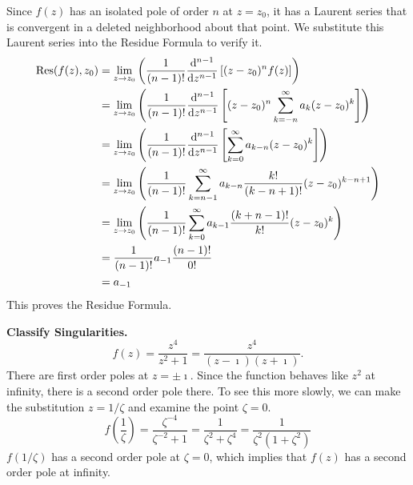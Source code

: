 {%
\begin{Solution}
  \label{solution residue formula}
  Since $f(z)$ has an isolated pole of order $n$ at $z = z_0$, it has
  a Laurent series that is convergent in a deleted neighborhood about 
  that point.  We substitute this Laurent series into the Residue
  Formula to verify it.
  \begin{align*}
    \mathop{\mathrm{Res}}\nolimits(f(z),z_0) 
    &= \lim_{z \to z_0} \left( \frac{1}{(n-1)!}
      \frac{\mathrm{d}^{n-1}}{\mathrm{d} z^{n-1}} \left[ (z-z_0)^n f(z) \right] 
    \right) \\
    &= \lim_{z \to z_0} \left( \frac{1}{(n-1)!}
      \frac{\mathrm{d}^{n-1}}{\mathrm{d} z^{n-1}} \left[ (z-z_0)^n 
        \sum_{k = -n}^\infty a_k (z - z_0)^k \right] \right) \\
    &= \lim_{z \to z_0} \left( \frac{1}{(n-1)!}
      \frac{\mathrm{d}^{n-1}}{\mathrm{d} z^{n-1}} \left[
        \sum_{k = 0}^\infty a_{k-n} (z - z_0)^k \right] \right) \\
    &= \lim_{z \to z_0} \left( \frac{1}{(n-1)!}
      \sum_{k = n-1}^\infty a_{k-n} \frac{ k! }{ (k-n+1)! } 
      (z - z_0)^{k-n+1} \right) \\
    &= \lim_{z \to z_0} \left( \frac{1}{(n-1)!}
      \sum_{k = 0}^\infty a_{k-1} \frac{ (k+n-1)! }{ k! } 
      (z - z_0)^k \right) \\
    &= \frac{1}{(n-1)!} a_{-1} \frac{(n-1)!}{0!} \\
    &= a_{-1}
  \end{align*}
  This proves the Residue Formula.
\end{Solution}














\begin{Solution}
  \label{solution z^4/(z^2+1)}
  \textbf{Classify Singularities.}
  \[
  f(z) = \frac{ z^4 }{ z^2 + 1 } = \frac{z^4}{(z-\imath)(z+\imath)}.
  \]
  There are first order poles at $z = \pm \imath$.  Since the function behaves
  like $z^2$ at infinity, there is a second order pole there.  To see this
  more slowly, we can make the substitution $z = 1/\zeta$ and examine the
  point $\zeta = 0$.
  \[
  f \left( \frac{1}{\zeta} \right) = \frac{\zeta^{-4}}{\zeta^{-2}+1}
  = \frac{1}{\zeta^2 + \zeta^4} = \frac{1}{\zeta^2(1 + \zeta^2)}
  \]
  $f(1/\zeta)$ has a second order pole at $\zeta = 0$, which implies that
  $f(z)$ has a second order pole at infinity.


\end{Solution}}

